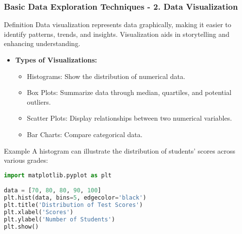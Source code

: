 \documentclass[aspectratio=169]{beamer}
\begin{document}
\begin{frame}[fragile]
    \frametitle{Basic Data Exploration Techniques - 2. Data Visualization}
    \begin{block}{Definition}
        Data visualization represents data graphically, making it easier to identify patterns, trends, and insights. Visualization aids in storytelling and enhancing understanding.
    \end{block}
    
    \begin{itemize}
        \item \textbf{Types of Visualizations:}
        \begin{itemize}
            \item Histograms: Show the distribution of numerical data.
            \item Box Plots: Summarize data through median, quartiles, and potential outliers.
            \item Scatter Plots: Display relationships between two numerical variables.
            \item Bar Charts: Compare categorical data.
        \end{itemize}
    \end{itemize}

    \begin{block}{Example}
        A histogram can illustrate the distribution of students' scores across various grades:
        \begin{lstlisting}[language=Python]
import matplotlib.pyplot as plt

data = [70, 80, 80, 90, 100]
plt.hist(data, bins=5, edgecolor='black')
plt.title('Distribution of Test Scores')
plt.xlabel('Scores')
plt.ylabel('Number of Students')
plt.show()
        \end{lstlisting}
    \end{block}
\end{frame}
\end{document}
